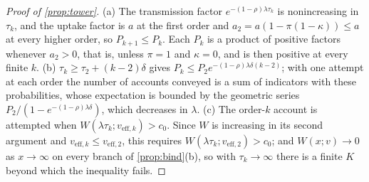 \begin{proof}[Proof of \autoref{prop:tower}]
(a) The transmission factor $e^{-(1-\rho)\lambda\tau_k}$ is nonincreasing in $\tau_k$, and the uptake factor is $a$ at the first order and $a_2 = a(1 - \pi(1-\kappa)) \le a$ at every higher order, so $P_{k+1} \le P_k$. Each $P_k$ is a product of positive factors whenever $a_2 > 0$, that is, unless $\pi = 1$ and $\kappa = 0$, and is then positive at every finite $k$. (b) $\tau_k \ge \tau_2 + (k-2)\delta$ gives $P_k \le P_2 e^{-(1-\rho)\lambda\delta(k-2)}$; with one attempt at each order the number of accounts conveyed is a sum of indicators with these probabilities, whose expectation is bounded by the geometric series $P_2/(1 - e^{-(1-\rho)\lambda\delta})$, which decreases in $\lambda$. (c) The order-$k$ account is attempted when $W(\lambda\tau_k; v_{\mathrm{eff},k}) > c_0$. Since $W$ is increasing in its second argument and $v_{\mathrm{eff},k} \le v_{\mathrm{eff},2}$, this requires $W(\lambda\tau_k; v_{\mathrm{eff},2}) > c_0$; and $W(x; v) \to 0$ as $x \to \infty$ on every branch of \autoref{prop:bind}(b), so with $\tau_k \to \infty$ there is a finite $K$ beyond which the inequality fails.
\end{proof}

\printbibliography


